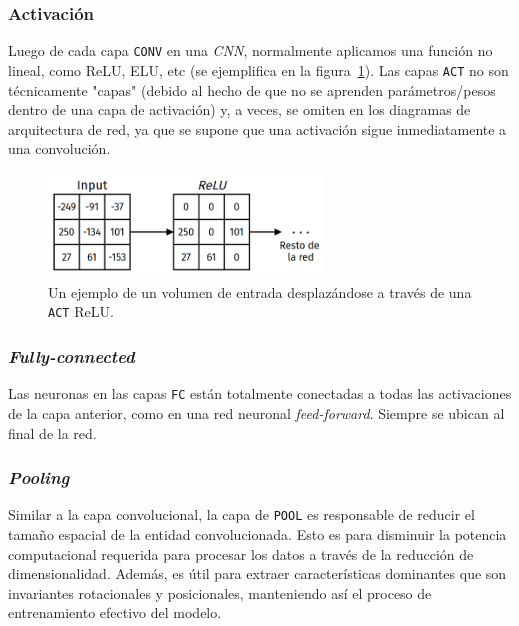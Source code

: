 \documentclass[a4paper,12pt]{article}
\begin{document}
\subsubsection{Activación}

Luego de cada capa \texttt{CONV} en una \textit{CNN}, normalmente aplicamos una función no lineal, como ReLU, ELU, etc (se ejemplifica en la figura~\ref{fig:relu-act}). Las capas \texttt{ACT} no son técnicamente "capas" (debido al hecho de que no se aprenden parámetros/pesos dentro de una capa de activación) y, a veces, se omiten en los diagramas de arquitectura de red, ya que se supone que una activación sigue inmediatamente a una convolución.

\begin{figure}[H]
	\begin{center}				
		\includegraphics[width=0.65\textwidth]{tesis_47.png}
		\caption{Un ejemplo de un volumen de entrada desplazándose a través de una \texttt{ACT} ReLU.}
		\label{fig:relu-act}
	\end{center}
\end{figure}

\subsubsection{\textit{Fully-connected}}
Las neuronas en las capas \texttt{FC} están totalmente conectadas a todas las activaciones de la capa anterior, como en una red neuronal \textit{feed-forward}. Siempre se ubican al final de la red.

\subsubsection{\textit{Pooling}}

Similar a la capa convolucional, la capa de \texttt{POOL} es responsable de reducir el tamaño espacial de la entidad convolucionada. Esto es para disminuir la potencia computacional requerida para procesar los datos a través de la reducción de dimensionalidad. Además, es útil para extraer características dominantes que son invariantes rotacionales y posicionales, manteniendo así el proceso de entrenamiento efectivo del modelo.
\end{document}
